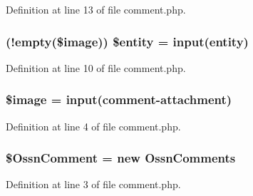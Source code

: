 Definition at line 13 of file comment.\+php.

\subsubsection[{\texorpdfstring{\$entity}{$entity}}]{ (!empty(\$image)) \$entity = {\bf input}(\textquotesingle{}entity\textquotesingle{})}\hypertarget{actions_2post_2entity_2comment_8php_a8ba0408ab2cd233ae9c29c581120312b}{}\label{actions_2post_2entity_2comment_8php_a8ba0408ab2cd233ae9c29c581120312b}


Definition at line 10 of file comment.\+php.

\subsubsection[{\texorpdfstring{\$image}{$image}}]{\setlength{\rightskip}{0pt plus 5cm}\$image = {\bf input}(\textquotesingle{}comment-\/attachment\textquotesingle{})}\hypertarget{actions_2post_2entity_2comment_8php_aac6146b4cdec66c94263ddb55afd5946}{}\label{actions_2post_2entity_2comment_8php_aac6146b4cdec66c94263ddb55afd5946}


Definition at line 4 of file comment.\+php.

\subsubsection[{\texorpdfstring{\$\+Ossn\+Comment}{$OssnComment}}]{\setlength{\rightskip}{0pt plus 5cm}\$Ossn\+Comment = new {\bf Ossn\+Comments}}\hypertarget{actions_2post_2entity_2comment_8php_a72b9fc252071bb4b4ec3ba0e1dc24760}{}\label{actions_2post_2entity_2comment_8php_a72b9fc252071bb4b4ec3ba0e1dc24760}


Definition at line 3 of file comment.\+php.


